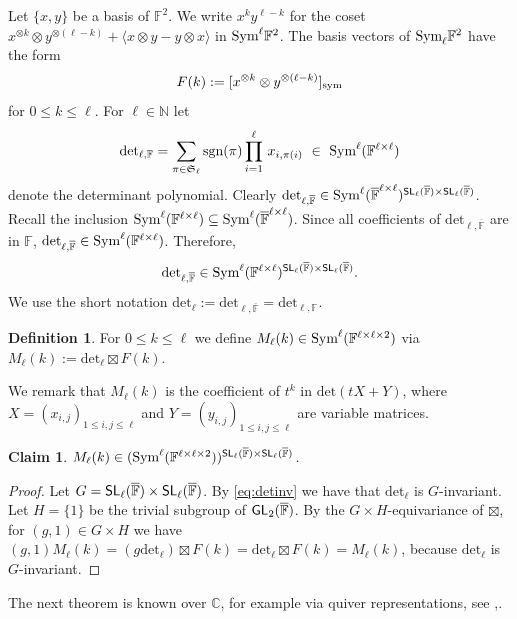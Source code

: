 \documentclass[a4paper]{extarticle}
\newcommand{\aS}{\mathfrak{S}}
\newcommand{\IN}{\mathbb{N}}
\newcommand{\IF}{\mathbb{F}}
\newcommand{\oIF}{{\overline{\mathbb{F}}}}
\newcommand{\IC}{\mathbb{C}}
\newcommand{\GL}{\textsf{\textup{GL}}}
\newcommand{\SL}{\textsf{\textup{SL}}}
\newcommand{\sgn}{\textup{sgn}}
\newcommand{\Sym}{\textup{Sym}}
\newcommand{\sym}{\textup{sym}}
\renewcommand{\det}{\mathrm{det}}
\numberwithin{theorem}{section}
\newtheorem{claim}[theorem]{Claim}
\theoremstyle{definition}
\newtheorem{definition/}[theorem]{Definition}
\newenvironment{definition}
  {\renewcommand{\qedsymbol}{\scalebox{0.65}{$\blacksquare$}}
   \pushQED{\qed}\begin{definition/}}
  {\popQED\end{definition/}}
\begin{document}
Let $\{x,y\}$ be a basis of $\IF^2$.
We write $x^ky^{\ell-k}$ for the coset $x^{\otimes k}\otimes y^{\otimes (\ell-k)} + \langle x\otimes y-y\otimes x \rangle$ in $\Sym^\ell\IF^2$.
The basis vectors of $\Sym_\ell \IF^2$ have the form 
\[
F(k) := [x^{\otimes k}\otimes y^{\otimes (\ell-k)}]_\sym
\]
for $0\leq k\leq \ell$.
For $\ell\in\IN$ let
\[
\det_{\ell,\IF}=\sum_{\pi\in\aS_\ell}\sgn(\pi)\prod_{i=1}^\ell \,x_{i,\pi(i)} \ \in \ \Sym^\ell(\IF^{\ell\times \ell})
\]
denote the determinant polynomial.
Clearly $\det_{\ell,\oIF} \in \Sym^{\ell}(\oIF^{\ell\times\ell})^{\SL_\ell(\oIF)\times \SL_\ell(\oIF)}$.
Recall the inclusion $\Sym^\ell(\IF^{\ell\times \ell})\subseteq\Sym^\ell(\oIF^{\ell\times \ell})$.
Since all coefficients of $\det_{\ell,\oIF}$ are in $\IF$, $\det_{\ell,\oIF} \in \Sym^\ell(\IF^{\ell\times \ell})$.
Therefore,
\begin{equation}\label{eq:detinv}
\det_{\ell,\oIF} \in \Sym^{\ell}(\IF^{\ell\times\ell})^{\SL_\ell(\oIF)\times \SL_\ell(\oIF)}.
\end{equation}
We use the short notation $\det_\ell := \det_{\ell,\oIF} = \det_{\ell,\IF}$.


\begin{definition}
For $0\leq k\leq \ell$
we define $M_\ell(k)\in \Sym^{\ell}(\IF^{\ell\times \ell\times 2})$ via
$
M_\ell(k) := \det_\ell \boxtimes F(k).
$
\end{definition}
We remark that $M_\ell(k)$ is the coefficient of $t^k$ in $\det(tX + Y)$, where $X=(x_{i,j})_{1\leq i,j\leq \ell}$ and $Y=(y_{i,j})_{1\leq i,j\leq \ell}$ are variable matrices.

\begin{claim}
$M_\ell(k) \in (\Sym^{\ell}(\IF^{\ell\times\ell\times 2}))^{\SL_\ell(\oIF)\times \SL_\ell(\oIF)}$.
\end{claim}
\begin{proof}
Let $G = \SL_\ell(\oIF)\times \SL_\ell(\oIF)$.
By \eqref{eq:detinv} we have that $\det_\ell$ is $G$-invariant.
Let $H = \{1\}$ be the trivial subgroup of $\GL_2(\oIF)$.
By the $G\times H$-equivariance of $\boxtimes$, for $(g,1)\in G\times H$ we have
$(g,1) M_\ell(k) = (g \det_\ell) \boxtimes F(k) = \det_\ell \boxtimes F(k) = M_\ell(k)$,
because $\det_\ell$ is $G$-invariant.
\end{proof}

The next theorem is known over $\IC$, for example via quiver representations, see \cite{derksen2017introduction},\cite{SW2000}.
\end{document}
